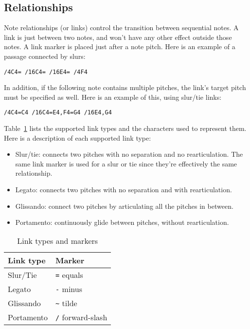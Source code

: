 \documentclass{scrartcl}
\begin{document}
\subsection{Relationships}
Note relationships (or links) control the transition between sequential notes. A link is just between two notes, and won't have any other effect outside those notes. A link marker is placed just after a note pitch. Here is an example of a passage connected by slurs:
\begin{center}
\verb|/4C4= /16C4= /16E4= /4F4|
\end{center}
In addition, if the following note contains multiple pitches, the link's target pitch must be specified as well. Here is an example of this, using slur/tie links:
\begin{center}
\verb|/4C4=C4 /16C4=E4,F4=G4 /16E4,G4|
\end{center}
Table~\ref{tab:link_markers} lists the supported link types and the characters used to represent them. Here is a description of each supported link type:
\begin{itemize}
\item Slur/tie: connects two pitches with no separation and no rearticulation. The same link marker is used for a slur or tie since they're effectively the same relationship.
\item Legato: connects two pitches with no separation and with rearticulation.
\item Glissando: connect two pitches by articulating all the pitches in between.
\item Portamento: continuously glide between pitches, without rearticulation.
\end{itemize}
\begin{table}[ht]
\begin{center}
  \begin{tabular}{ l | l}
    \hline
    \textbf{Link type} & \textbf{Marker} \\ \hline
    Slur/Tie & \verb|=| \hspace{.1cm} equals \\ \hline
    Legato & \verb|-| \hspace{.1cm} minus \\ \hline
    Glissando & \verb|~| \hspace{.1cm} tilde \\ \hline
    Portamento & \verb|/| \hspace{.1cm} forward-slash \\ \hline
    \hline
  \end{tabular}
\end{center}
\caption{Link types and markers}
\label{tab:link_markers}
\end{table}
\end{document}
